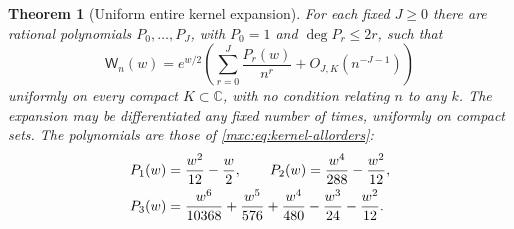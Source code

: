 \documentclass[11pt]{article}
\numberwithin{equation}{section}
\newtheorem{theorem}{Theorem}[section]
\theoremstyle{definition}
\theoremstyle{remark}
\begin{document}
\begin{theorem}[Uniform entire kernel expansion]\label{mxc:tp:thm:kernel}
For each fixed $J\ge0$ there are rational polynomials $P_0,\ldots,P_J$,
with $P_0=1$ and $\deg P_r\le2r$, such that
\begin{equation}\label{mxc:tp:eq:kernelall}
 \mathsf W_n(w)=e^{w/2}\left(\sum_{r=0}^{J}\frac{P_r(w)}{n^r}
 +O_{J,K}(n^{-J-1})\right)
\end{equation}
uniformly on every compact $K\subset\mathbb C$, with no condition
relating $n$ to any $k$. The expansion may be differentiated any fixed
number of times, uniformly on compact sets. The polynomials are those of
\eqref{mxc:eq:kernel-allorders}:
\begin{align}
 P_1(w)&=\frac{w^2}{12}-\frac w2,\qquad
 P_2(w)=\frac{w^4}{288}-\frac{w^2}{12},\notag\\
 P_3(w)&=\frac{w^6}{10368}+\frac{w^5}{576}+\frac{w^4}{480}
 -\frac{w^3}{24}-\frac{w^2}{12}.\label{mxc:tp:eq:p3}
\end{align}
\end{theorem}
\end{document}
